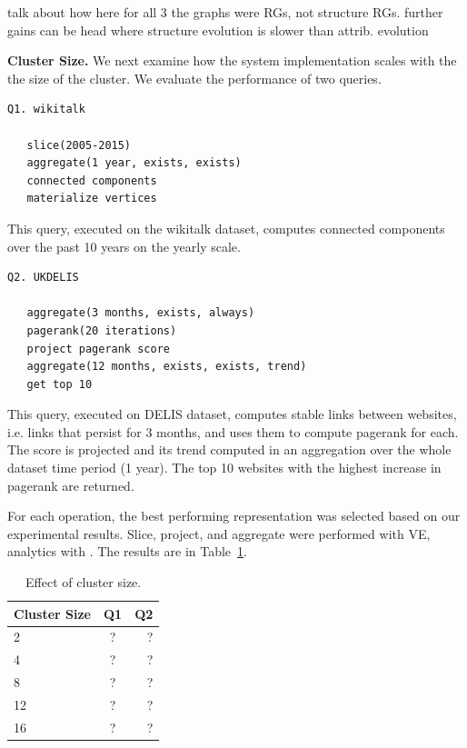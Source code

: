 talk about how here for all 3 the graphs were RGs, not structure RGs. further gains can be head where structure evolution is slower than attrib. evolution

{\bf Cluster Size.}  We next examine how the system implementation
scales with the the size of the cluster.  We evaluate the performance
of two queries.

\begin{small}
\begin{verbatim}
Q1. wikitalk

   slice(2005-2015)
   aggregate(1 year, exists, exists)
   connected components
   materialize vertices
\end{verbatim}
\end{small}

This query, executed on the wikitalk dataset, computes connected
components over the past 10 years on the yearly scale.

\begin{small}
\begin{verbatim}
Q2. UKDELIS

   aggregate(3 months, exists, always)
   pagerank(20 iterations)
   project pagerank score
   aggregate(12 months, exists, exists, trend)
   get top 10
\end{verbatim}
\end{small}

This query, executed on DELIS dataset, computes stable links between
websites, i.e. links that persist for 3 months, and uses them to
compute pagerank for each.  The score is projected and its trend
computed in an aggregation over the whole dataset time period (1
year).  The top 10 websites with the highest increase in pagerank are
returned.

For each operation, the best performing representation was selected
based on our experimental results.  Slice, project, and aggregate were
performed with VE, analytics with \hg.  The results are in
Table~\ref{tab:clustersize}.

\begin{table}
\caption{Effect of cluster size.}
\small
\begin{tabular}{| l | c | r |}
\hline
\multicolumn{1}{|l|}{\bfseries Cluster Size} & \multicolumn{1}{c|}{\bfseries Q1} & \multicolumn{1}{r}{\bfseries Q2} \\ \hline
2 & ? & ? \\ \hline
4 & ? & ? \\ \hline
8 & ? & ? \\ \hline
12 & ? & ? \\ \hline
16 & ? & ? \\ \hline
\end{tabular}
\label{tab:clustersize}
\end{table}
